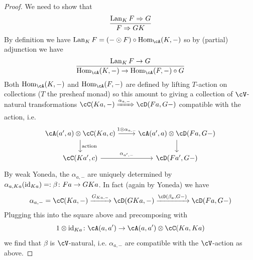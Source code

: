 \documentclass[a4paper,11pt,oneside,openany]{scrbook}
\begin{document}
\begin{proof}
	We need to show that
	\begin{displaymath}
		\frac{\operatorname{Lan}_K F \Rightarrow G}{F \Rightarrow GK}
	\end{displaymath}
	By definition we have $ \Lan_K F = (- \odot F) \circ \Hom_\cA(K,-) $ so by (partial) adjunction we have
	\begin{displaymath}
		\frac{\Lan_K F \to G}{\Hom_\cA(K,-) \to \Hom_\cA(F,-)\circ G}
	\end{displaymath}
	Both $ \Hom_\cA(K,-) $ and $ \Hom_\cA(F ,-) $ are defined by lifting $ T $-action on collections ($ T $ the presheaf monad) so this amount to giving a collection of $ \cV $-natural transformations
	$ \cC(Ka,-) \xRightarrow{\alpha_{a,-}} \cD(Fa,G-) $ compatible with the action, i.e.
	\begin{displaymath}
		\begin{tikzcd}
			{\cA(a',a) \otimes \cC(Ka,c)}
			\arrow[r, "1\otimes \alpha_{a,-}"]
			\arrow[d,"\text{action}"]
			& {\cA(a',a)} \otimes \cD(Fa,G-) \arrow[d]\\
			{\cC(Ka',c)} \arrow[r, "{\alpha_{a',-}}"] &{\cD(Fa',G-)}
		\end{tikzcd}
	\end{displaymath}
	By weak Yoneda, the $ \alpha_{a,-} $ are uniquely determined by $ \alpha_{a,Ka}(\operatorname{id}_{Ka}) =: \beta \colon Fa \to GKa $.
	In fact (again by Yoneda) we have
	\begin{displaymath}
		\alpha_{a,-} = \cC(Ka,-) \xrightarrow{G_{Ka,-}} \cD(GKa,-) \xrightarrow{\cD(\beta_a, G-)} \cD(Fa, G-)
	\end{displaymath}
	Plugging this into the square above and precomposing with
	\begin{displaymath}
		1\otimes \id_{Ka} \from \cA(a,a') \to \cA(a,a')\otimes \cC(Ka,Ka)
	\end{displaymath}
	we find that $ \beta $ is $ \cV $-natural, i.e. $ \alpha_{a,-} $ are compatible with the $ \cV $-action as above.
\end{proof}
\end{document}
